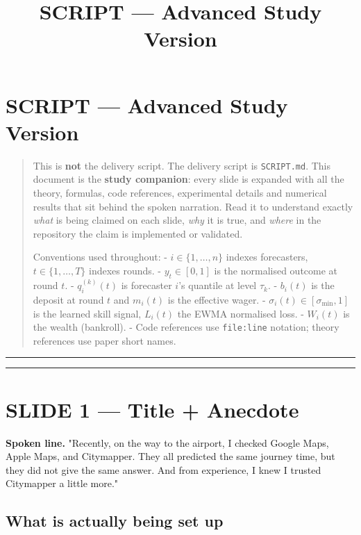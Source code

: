 \documentclass[11pt]{article}
\title{SCRIPT --- Advanced Study Version}
\author{}
\date{}
\begin{document}
\maketitle

\section*{SCRIPT --- Advanced Study Version}


\begin{quote}
This is \textbf{not} the delivery script. The delivery script is \texttt{SCRIPT.md}.
This document is the \textbf{study companion}: every slide is expanded with all the
theory, formulas, code references, experimental details and numerical results
that sit behind the spoken narration. Read it to understand exactly \emph{what} is
being claimed on each slide, \emph{why} it is true, and \emph{where} in the repository
the claim is implemented or validated.

Conventions used throughout:
- $i \in \{1, \dots, n\}$ indexes forecasters, $t \in \{1, \dots, T\}$ indexes rounds.
- $y_t \in [0,1]$ is the normalised outcome at round $t$.
- $q_i^{(k)}(t)$ is forecaster $i$'s quantile at level $\tau_k$.
- $b_i(t)$ is the deposit at round $t$ and $m_i(t)$ is the effective wager.
- $\sigma_i(t) \in [\sigma_{\min}, 1]$ is the learned skill signal, $L_i(t)$ the EWMA normalised loss.
- $W_i(t)$ is the wealth (bankroll).
- Code references use \texttt{file:line} notation; theory references use paper short names.
\end{quote}

\bigskip\hrule\bigskip

\tableofcontents

\bigskip\hrule\bigskip

\section{SLIDE 1 --- Title + Anecdote}


\textbf{Spoken line.} "Recently, on the way to the airport, I checked Google Maps, Apple Maps, and Citymapper. They all predicted the same journey time, but they did not give the same answer. And from experience, I knew I trusted Citymapper a little more."

\subsection{What is actually being set up}
\end{document}
